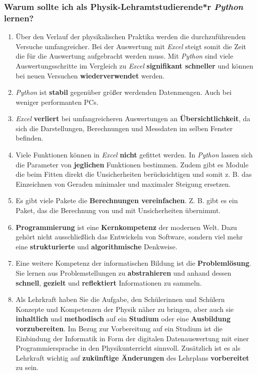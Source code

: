 \documentclass[12pt]{scrbook}
\begin{document}
\subsubsection{Warum sollte ich als Physik-Lehramtstudierende*r \textit{Python} lernen?}

\begin{enumerate}

\item Über den Verlauf der physikalischen Praktika werden die durchzuführenden Versuche umfangreicher. Bei der Auswertung mit \textit{Excel} steigt somit die Zeit die für die Auswertung aufgebracht werden muss. Mit \textit{Python} sind viele Auswertungsschritte im Vergleich zu \textit{Excel} \textbf{signifikant schneller} und können bei neuen Versuchen \textbf{wiederverwendet} werden. 
\item \textit{Python} ist \textbf{stabil} gegenüber größer werdenden Datenmengen. Auch bei weniger performanten PCs.
\item \textit{Excel} \textbf{verliert} bei umfangreicheren Auswertungen an \textbf{Übersichtlichkeit}, da sich die Darstellungen, Berechnungen und Messdaten im selben Fenster befinden.
\item Viele Funktionen können in \textit{Excel} \textbf{nicht} gefittet werden. In \textit{Python} lassen sich die Parameter von \textbf{jeglichen} Funktionen bestimmen. Zudem gibt es Module die beim Fitten direkt die Unsicherheiten berücksichtigen und somit z. B. das Einzeichnen von Geraden minimaler und maximaler Steigung ersetzen.
\item Es gibt viele Pakete die \textbf{Berechnungen vereinfachen}. Z. B. gibt es ein Paket, das die Berechnung von und mit Unsicherheiten übernimmt.
\item \textbf{Programmierung} ist eine \textbf{Kernkompetenz} der modernen Welt. Dazu gehört nicht ausschließlich das Entwickeln von Software, sondern viel mehr eine \textbf{strukturierte} und \textbf{algorithmische} Denkweise. 
\item Eine weitere Kompetenz der informatischen Bildung ist die \textbf{Problemlösung}. Sie lernen aus Problemstellungen zu \textbf{abstrahieren} und anhand dessen \textbf{schnell}, \textbf{gezielt} und \textbf{reflektiert} Informationen zu sammeln.
\item Als Lehrkraft haben Sie die Aufgabe, den Schülerinnen und Schülern Konzepte und Kompetenzen der Physik näher zu bringen, aber auch sie \textbf{inhaltlich} und \textbf{methodisch} auf ein \textbf{Studium} oder eine \textbf{Ausbildung vorzubereiten}. Im Bezug zur Vorbereitung auf ein Studium ist die Einbindung der Informatik in Form der digitalen Datenauswertung mit einer Programmiersprache in den Physikunterricht sinnvoll. Zusätzlich ist es als Lehrkraft wichtig auf \textbf{zukünftige Änderungen} des Lehrplans \textbf{vorbereitet} zu sein.

\end{enumerate}
\end{document}
